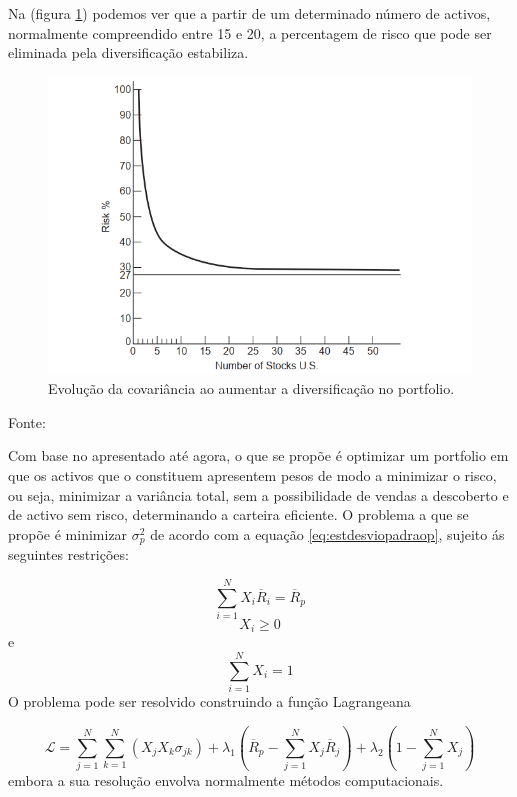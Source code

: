 \documentclass[
  12pt,
  a4paper,
  openany]{book}
\begin{document}
Na (figura \ref{fig:covusa}) podemos ver que a partir de um determinado número de activos, normalmente compreendido entre 15 e 20, a percentagem de risco que pode ser eliminada pela diversificação estabiliza.



\begin{figure}

{\centering \includegraphics[width=0.6\linewidth]{image/covusa} 

}

\caption{Evolução da covariância ao aumentar a diversificação no portfolio.}\label{fig:covusa}
\end{figure}
\FloatBarrier
\centering

Fonte: \citep[pp.58]{Goetzmann2014}

\justifying
\bigskip

Com base no apresentado até agora, o que se propõe é optimizar um portfolio em que os activos que o constituem apresentem pesos de modo a minimizar o risco, ou seja, minimizar a variância total, sem a possibilidade de vendas a descoberto e de activo sem risco, determinando a carteira eficiente. O problema a que se propõe é minimizar \(\sigma_{p}^{2}\) de acordo com a equação \eqref{eq:estdesviopadraop}, sujeito ás seguintes restrições:

\begin{equation} 
  \sum_{i=1}^{N}X_{i}\overline{R}_{i}=\overline{R}_{p}
  \label{eq:und}
\end{equation}
\[X_{i}\geq0\] e \[\sum_{i=1}^{N}X_{i}=1\]
O problema pode ser resolvido construindo a função Lagrangeana

\begin{equation} 
  \mathcal{L} = \sum_{j=1}^{N}\sum_{k=1}^{N}(X_{j}X_{k}\sigma_{jk})+\lambda_{1}(\overline{R}_{p}-\sum_{j=1}^{N}X_{j}\overline{R}_{j})+\lambda_{2}(1-\sum_{j=1}^{N}X_{j})
  \label{eq:lagrangeana}
\end{equation}
embora a sua resolução envolva normalmente métodos computacionais.
\end{document}
